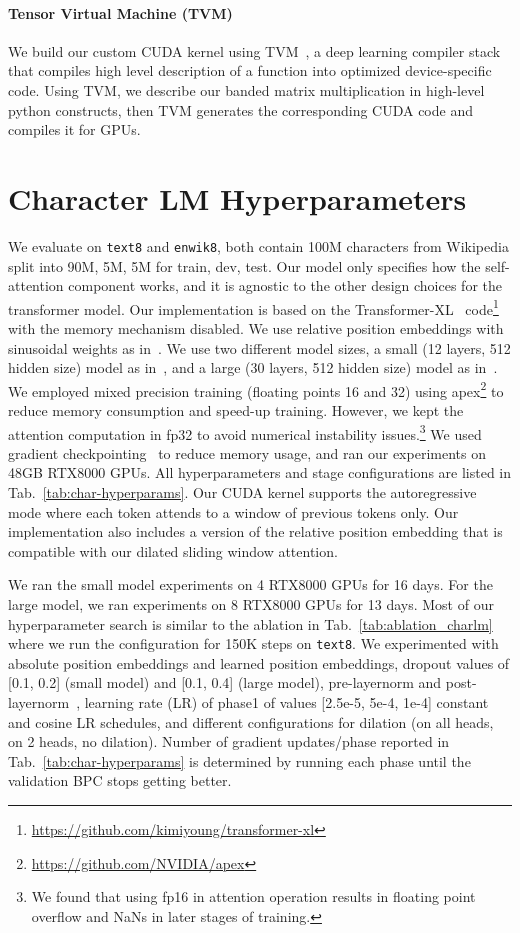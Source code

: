 \documentclass[11pt,a4paper]{article}
\begin{document}
\paragraph{Tensor Virtual Machine (TVM)}
We build our custom CUDA kernel using TVM~\cite{tvm}, a deep learning compiler stack that compiles
high level description of a function into optimized device-specific code.
Using TVM, we describe our banded matrix multiplication in 
high-level python constructs, then TVM generates the corresponding CUDA code
and compiles it for GPUs.

\section{Character LM Hyperparameters}
\label{sec:charlmapp}

We evaluate on \texttt{text8} and \texttt{enwik8}, both contain 100M 
characters from Wikipedia split into 90M, 5M, 5M for train, dev, test. 
Our model only specifies how the self-attention component works, and it is 
agnostic to the other design choices for the transformer model. 
Our implementation is based on the Transformer-XL~\cite{transformerxl}
code\footnote{\url{https://github.com/kimiyoung/transformer-xl}} 
with the memory mechanism disabled. 
We use relative position embeddings with sinusoidal weights as in~\citet{transformerxl}. 
We use two different model sizes, a small (12 layers, 512 hidden size) model as in~\citet{transformerxl}, 
and a large (30 layers, 512 hidden size) model as in~\citet{sparseOpenai}.
We employed mixed precision training (floating points 16 and 32) using apex\footnote{\url{https://github.com/NVIDIA/apex}} to reduce memory consumption and speed-up training. However,  we kept the attention computation in fp32
to avoid numerical instability issues.\footnote{We found that using fp16 in attention operation results in floating point overflow and NaNs in later stages of training.}
We used gradient checkpointing~\cite{gradckpt} to reduce memory usage, and ran our experiments on 48GB RTX8000 GPUs. 
All hyperparameters and stage configurations are listed in Tab.~\ref{tab:char-hyperparams}. 
Our CUDA kernel supports the autoregressive mode where each token 
attends to a window of previous tokens only. Our implementation 
also includes a version of the relative position embedding
that is compatible with our dilated sliding window attention.

We ran the small model experiments on 4 RTX8000 GPUs for 16 days.
For the large model, we ran experiments on 8 RTX8000 GPUs for 
13 days. 
Most of our hyperparameter search is similar to the ablation in Tab.~\ref{tab:ablation_charlm} where we run the configuration for 150K steps
on \texttt{text8}.
We experimented with absolute position embeddings and learned position embeddings,
dropout values of [0.1, 0.2] (small model) and [0.1, 0.4] (large model), 
pre-layernorm and post-layernorm~\cite{layernorm}, learning rate (LR) of phase1 of values 
[2.5e-5, 5e-4, 1e-4]
constant and cosine LR schedules, 
and different configurations for dilation (on all heads, on 2 heads, no dilation).
Number of gradient updates/phase
reported in Tab.~\ref{tab:char-hyperparams} is determined by running each phase until the validation BPC stops getting better. 
\end{document}
